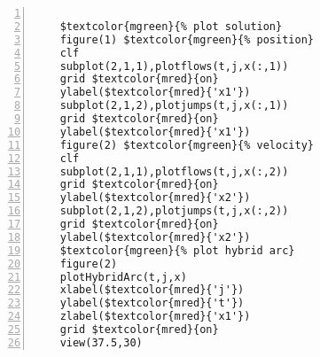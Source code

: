 %  
%  
%  
%  
  
  
\DefineShortVerb[fontfamily=courier,fontseries=m]{\$} 
\DefineShortVerb[fontfamily=courier,fontseries=b]{\#} 
  
\begin{Verbatim}[commandchars=\$\{\},numbers=left,numbersep=2pt] 

    $textcolor{mgreen}{% plot solution} 
    figure(1) $textcolor{mgreen}{% position} 
    clf 
    subplot(2,1,1),plotflows(t,j,x(:,1)) 
    grid $textcolor{mred}{on} 
    ylabel($textcolor{mred}{'x1'}) 
    subplot(2,1,2),plotjumps(t,j,x(:,1)) 
    grid $textcolor{mred}{on} 
    ylabel($textcolor{mred}{'x1'}) 
    figure(2) $textcolor{mgreen}{% velocity} 
    clf 
    subplot(2,1,1),plotflows(t,j,x(:,2)) 
    grid $textcolor{mred}{on} 
    ylabel($textcolor{mred}{'x2'}) 
    subplot(2,1,2),plotjumps(t,j,x(:,2)) 
    grid $textcolor{mred}{on} 
    ylabel($textcolor{mred}{'x2'}) 
    $textcolor{mgreen}{% plot hybrid arc} 
    figure(2) 
    plotHybridArc(t,j,x) 
    xlabel($textcolor{mred}{'j'}) 
    ylabel($textcolor{mred}{'t'}) 
    zlabel($textcolor{mred}{'x1'}) 
    grid $textcolor{mred}{on} 
    view(37.5,30)  
\end{Verbatim}  
  
\UndefineShortVerb{\$} 
\UndefineShortVerb{\#} 
 